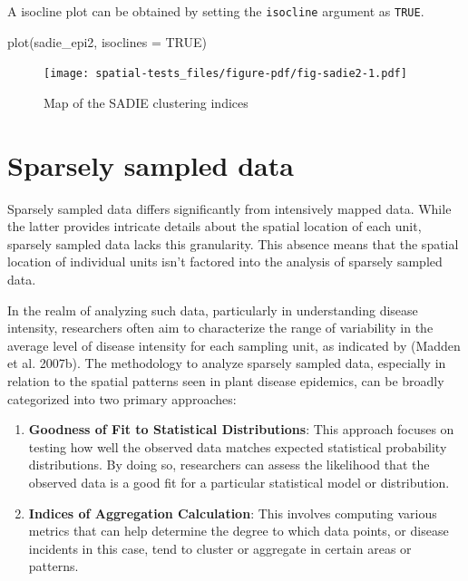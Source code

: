 \documentclass[
  letterpaper,
]{book}
\newenvironment{Shaded}{\begin{snugshade}}{\end{snugshade}}
\newcommand{\AttributeTok}[1]{\textcolor[rgb]{0.40,0.45,0.13}{#1}}
\newcommand{\ConstantTok}[1]{\textcolor[rgb]{0.56,0.35,0.01}{#1}}
\newcommand{\FunctionTok}[1]{\textcolor[rgb]{0.28,0.35,0.67}{#1}}
\newcommand{\NormalTok}[1]{\textcolor[rgb]{0.00,0.23,0.31}{#1}}
\begin{document}
A isocline plot can be obtained by setting the \texttt{isocline}
argument as \texttt{TRUE}.

\begin{Shaded}
\begin{Highlighting}[]
\FunctionTok{plot}\NormalTok{(sadie\_epi2, }\AttributeTok{isoclines =} \ConstantTok{TRUE}\NormalTok{)}
\end{Highlighting}
\end{Shaded}

\begin{figure}[H]

\texttt{[image: spatial-tests\_files/figure-pdf/fig-sadie2-1.pdf]} \hfill{}

\caption{\label{fig-sadie2}Map of the SADIE clustering indices}

\end{figure}

\hypertarget{sparsely-sampled-data}{%
\section{Sparsely sampled data}\label{sparsely-sampled-data}}

Sparsely sampled data differs significantly from intensively mapped
data. While the latter provides intricate details about the spatial
location of each unit, sparsely sampled data lacks this granularity.
This absence means that the spatial location of individual units isn't
factored into the analysis of sparsely sampled data.

In the realm of analyzing such data, particularly in understanding
disease intensity, researchers often aim to characterize the range of
variability in the average level of disease intensity for each sampling
unit, as indicated by (Madden et al. 2007b). The methodology to analyze
sparsely sampled data, especially in relation to the spatial patterns
seen in plant disease epidemics, can be broadly categorized into two
primary approaches:

\begin{enumerate}
\def\labelenumi{\arabic{enumi}.}
\item
  \textbf{Goodness of Fit to Statistical Distributions}: This approach
  focuses on testing how well the observed data matches expected
  statistical probability distributions. By doing so, researchers can
  assess the likelihood that the observed data is a good fit for a
  particular statistical model or distribution.
\item
  \textbf{Indices of Aggregation Calculation}: This involves computing
  various metrics that can help determine the degree to which data
  points, or disease incidents in this case, tend to cluster or
  aggregate in certain areas or patterns.
\end{enumerate}
\end{document}
